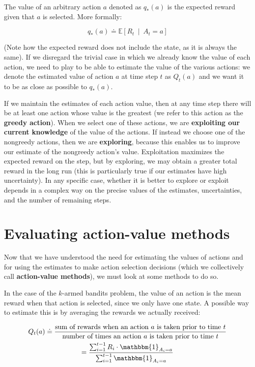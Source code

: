 The value of an arbitrary action $a$ denoted as $q_*(a)$ is the expected reward given that $a$ is selected. More formally:

\begin{equation*}
    q_*(a) \doteq \mathbb{E} \left[ R_t \  \middle\vert \  A_t = a \right]
\end{equation*}

(Note how the expected reward does not include the state, as it is always the same). If we disregard the trivial case in which we already know the value of each action, we need to play to be able to estimate the value of the various actions: we denote the estimated value of action $a$ at time step $t$ as $Q_t(a)$ and we want it to be as close as possible to $q_*(a)$.

If we maintain the estimates of each action value, then at any time step there will be at least one action whose value is the greatest (we refer to this action as the \textbf{greedy action}). When we select one of these actions, we are \textbf{exploiting our current knowledge} of the value of the actions. If instead we choose one of the nongreedy actions, then we are \textbf{exploring}, because this enables us to improve our estimate of the nongreedy action’s value. Exploitation maximizes the expected reward on the step, but by exploring, we may obtain a greater total reward in the long run (this is particularly true if our estimates have high uncertainty). In any specific case, whether it is better to explore or exploit depends in a complex way on the precise values of the estimates, uncertainties, and the number of remaining steps.

\section{Evaluating action-value methods}
Now that we have understood the need for estimating the values of actions and for using the estimates to make action selection decisions (which we collectively call \textbf{action-value methods}), we must look at some methods to do so.

In the case of the $k$-armed bandits problem, the value of an action is the mean reward when that action is selected, since we only have one state. A possible way to estimate this is by averaging the rewards we actually received:

\begin{gather}
    Q_t(a) \doteq \frac{\text{sum of rewards when an action } a \text{ is taken prior to time } t}{\text{number of times an action } a \text{ is taken prior to time } t}\nonumber\\
    = \frac{\sum_{i=1}^{t-1} R_i \cdot \mathbbm{1}_{A_i = a}}{\sum_{i=1}^{t-1} \mathbbm{1}_{A_i = a}}
    \label{eq:ch3-sampleaveragemethod}
\end{gather}

